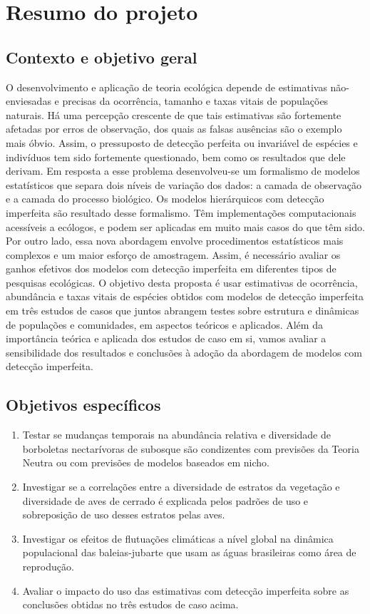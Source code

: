 \documentclass[12pt, A4]{article}
\begin{document}
\section{Resumo do projeto}

\subsection{Contexto e objetivo geral}
\label{sec:contexto}
O desenvolvimento e aplicação de teoria ecológica depende de estimativas
não-enviesadas e precisas da ocorrência, tamanho e taxas vitais de
populações naturais. Há uma percepção crescente de que
tais estimativas são fortemente afetadas por erros de observação, dos
quais as falsas ausências são o exemplo mais óbvio. Assim, o
pressuposto de detecção perfeita ou invariável de espécies e
indivíduos tem sido fortemente questionado, bem como os resultados que
dele derivam. Em resposta a esse problema desenvolveu-se um formalismo
de modelos estatísticos que separa dois níveis de
variação dos dados: a camada de observação e a camada do processo
biológico. Os  modelos hierárquicos com detecção
imperfeita são resultado desse formalismo. Têm implementações
computacionais acessíveis a ecólogos, e podem ser aplicadas em muito
mais casos do que têm sido. Por outro lado, essa nova abordagem
envolve procedimentos estatísticos mais complexos e um maior esforço
de amostragem. Assim, é necessário avaliar os ganhos efetivos dos
modelos com detecção imperfeita em diferentes tipos de pesquisas
ecológicas. O objetivo desta proposta é usar estimativas de
ocorrência, abundância e taxas vitais de espécies obtidos com modelos
de detecção imperfeita em três estudos de casos que juntos abrangem
testes sobre estrutura e dinâmicas de populações e comunidades, em
aspectos teóricos e aplicados. Além da importância teórica e aplicada
dos estudos de caso em si, vamos avaliar a sensibilidade dos
resultados e conclusões à adoção da abordagem de modelos com detecção
imperfeita.

\subsection{Objetivos específicos}
\label{sec:especificos}
\begin{enumerate}
\item Testar se mudanças temporais na abundância relativa e
  diversidade de borboletas nectarívoras de subosque  
  são condizentes com previsões da Teoria Neutra ou com
  previsões de modelos baseados em nicho. 
\item Investigar se a correlações entre a diversidade de estratos da
  vegetação e diversidade de aves de cerrado é explicada pelos padrões
  de uso e sobreposição de uso desses estratos pelas aves.
\item Investigar os efeitos de flutuações climáticas a nível global na
  dinâmica populacional das baleias-jubarte que usam as águas
  brasileiras como área de reprodução.
\item Avaliar o impacto do uso das estimativas com detecção imperfeita
  sobre as conclusões obtidas no três estudos de caso acima.
\end{enumerate}
\end{document}
